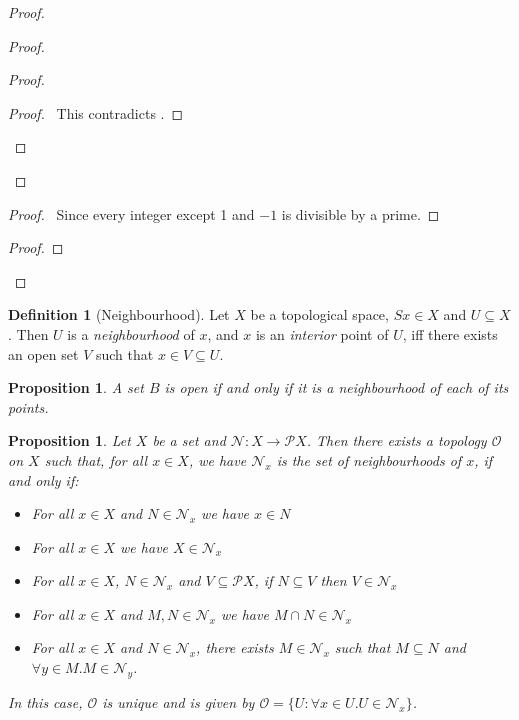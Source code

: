 \documentclass{book}
\let\qed\relax
\newtheorem{prop}[ax]{Proposition}
\theoremstyle{definition}
\newtheorem{df}[ax]{Definition}
\begin{document}
\begin{proof}
\begin{proof}
\begin{proof}
\begin{proof}
			\pf\ This contradicts .
		\end{proof}
	\end{proof}
\end{proof}
\begin{proof}
	\pf\ Since every integer except 1 and $-1$ is divisible by a prime.
\end{proof}
\begin{proof}
\end{proof}
\qed
\end{proof}

\begin{df}[Neighbourhood]
Let $X$ be a topological space, $Sx \in X$ and $U \subseteq X$. Then $U$ is a \emph{neighbourhood} of $x$, and $x$ is an \emph{interior} point of $U$, iff there exists an open set $V$ such that $x \in V \subseteq U$.
\end{df}

\begin{prop}
A set $B$ is open if and only if it is a neighbourhood of each of its points.
\end{prop}

\begin{prop}
Let $X$ be a set and $\mathcal{N} : X \rightarrow \mathcal{P} X$. Then there exists a topology $\mathcal{O}$ on $X$ such that, for all $x \in X$, we have $\mathcal{N}_x$ is the set of neighbourhoods of $x$, if and only if:
\begin{itemize}
\item For all $x \in X$ and $N \in \mathcal{N}_x$ we have $x \in N$
\item For all $x \in X$ we have $X \in \mathcal{N}_x$
\item For all $x \in X$, $N \in \mathcal{N}_x$ and $V \subseteq \mathcal{P} X$, if $N \subseteq V$ then $V \in \mathcal{N}_x$
\item For all $x \in X$ and $M, N \in \mathcal{N}_x$ we have $M \cap N \in \mathcal{N}_x$
\item For all $x \in X$ and $N \in \mathcal{N}_x$, there exists $M \in \mathcal{N}_x$ such that $M \subseteq N$ and $\forall y \in M. M \in \mathcal{N}_y$.
\end{itemize}
In this case, $\mathcal{O}$ is unique and is given by $\mathcal{O} = \{ U : \forall x \in U. U \in \mathcal{N}_x \}$.
\end{prop}
\end{document}
